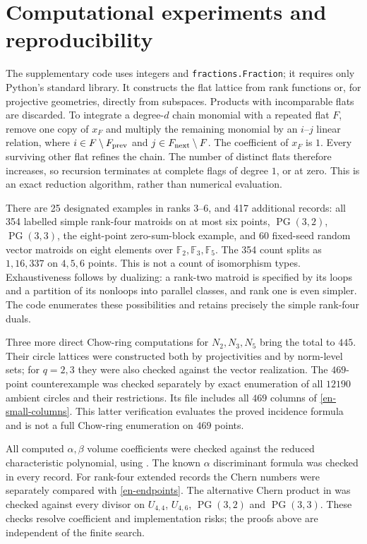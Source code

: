 \documentclass[12pt]{amsart}
\theoremstyle{definition}
\theoremstyle{remark}
\numberwithin{equation}{section}
\begin{document}
\section{Computational experiments and reproducibility}
The supplementary code uses integers and \texttt{fractions.Fraction}; it requires only Python's standard library. It constructs the flat lattice from rank functions or, for projective geometries, directly from subspaces. Products with incomparable flats are discarded. To integrate a degree-$d$ chain monomial with a repeated flat $F$, remove one copy of $x_F$ and multiply the remaining monomial by an $i$--$j$ linear relation, where $i\in F\setminus F_{\rm prev}$ and $j\in F_{\rm next}\setminus F$. The coefficient of $x_F$ is $1$. Every surviving other flat refines the chain. The number of distinct flats therefore increases, so recursion terminates at complete flags of degree $1$, or at zero. This is an exact reduction algorithm, rather than numerical evaluation.

There are 25 designated examples in ranks $3$--$6$, and 417 additional records: all 354 labelled simple rank-four matroids on at most six points, $\operatorname{PG}(3,2)$, $\operatorname{PG}(3,3)$, the eight-point zero-sum-block example, and 60 fixed-seed random vector matroids on eight elements over $\mathbb F_2,\mathbb F_3,\mathbb F_5$. The 354 count splits as $1,16,337$ on $4,5,6$ points. This is not a count of isomorphism types. Exhaustiveness follows by dualizing: a rank-two matroid is specified by its loops and a partition of its nonloops into parallel classes, and rank one is even simpler. The code enumerates these possibilities and retains precisely the simple rank-four duals.

Three more direct Chow-ring computations for $N_2,N_3,N_5$ bring the total to $445$. Their circle lattices were constructed both by projectivities and by norm-level sets; for $q=2,3$ they were also checked against the vector realization. The $469$-point counterexample was checked separately by exact enumeration of all $12190$ ambient circles and their restrictions. Its file includes all $469$ columns of \eqref{en-small-columns}. This latter verification evaluates the proved incidence formula and is not a full Chow-ring enumeration on $469$ points.

All computed $\alpha,\beta$ volume coefficients were checked against the reduced characteristic polynomial, using \cite[Proposition 9.5]{AHK}. The known $\alpha$ discriminant formula was checked in every record. For rank-four extended records the Chern numbers were separately compared with \eqref{en-endpoints}. The alternative Chern product in \cite[Theorem 3.4]{Che} was checked against every divisor on $U_{4,4}$, $U_{4,6}$, $\operatorname{PG}(3,2)$ and $\operatorname{PG}(3,3)$. These checks resolve coefficient and implementation risks; the proofs above are independent of the finite search.
\end{document}
